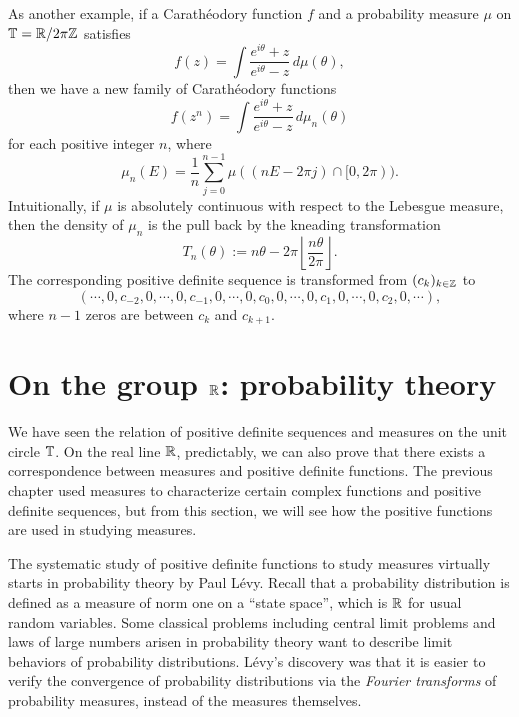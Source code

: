 \documentclass[10pt]{article}
\begin{document}
\begin{ex}
As another example, if a Carath\'eodory function $f$ and a probability measure $\mu$ on $\mathbb{T}=\mathbb{R}/2\pi\mathbb{Z}$ satisfies
\[f(z)=\int\frac{e^{i\theta}+z}{e^{i\theta}-z}\,d\mu(\theta),\]
then we have a new family of Carath\'eodory functions
\[f(z^n)=\int\frac{e^{i\theta}+z}{e^{i\theta}-z}\,d\mu_n(\theta)\]
for each positive integer $n$, where
\[\mu_n(E)=\frac1n\sum_{j=0}^{n-1}\mu((nE-2\pi j)\cap[0,2\pi)).\]
Intuitionally, if $\mu$ is absolutely continuous with respect to the Lebesgue measure, then the density of $\mu_n$ is the pull back by the kneading transformation
\[T_n(\theta):=n\theta-2\pi\left\lfloor\frac{n\theta}{2\pi}\right\rfloor.\]
The corresponding positive definite sequence is transformed from $(c_k)_{k\in\mathbb{Z}}$ to
\[(\cdots,0,c_{-2},0,\cdots,0,c_{-1},0,\cdots,0,c_0,0,\cdots,0,c_1,0,\cdots,0,c_2,0,\cdots),\]
where $n-1$ zeros are between $c_k$ and $c_{k+1}$.
\end{ex}

















\newpage
\section{On the group $\mathbb{R}$: probability theory}



We have seen the relation of positive definite sequences and measures on the unit circle $\mathbb{T}$.
On the real line $\mathbb{R}$, predictably, we can also prove that there exists a correspondence between measures and positive definite functions.
The previous chapter used measures to characterize certain complex functions and positive definite sequences, but from this section, we will see how the positive functions are used in studying measures.

The systematic study of positive definite functions to study measures virtually starts in probability theory by Paul L\'evy.
Recall that a probability distribution is defined as a measure of norm one on a ``state space'', which is $\mathbb{R}$ for usual random variables.
Some classical problems including central limit problems and laws of large numbers arisen in probability theory want to describe limit behaviors of probability distributions.
L\'evy's discovery was that it is easier to verify the convergence of probability distributions via the \emph{Fourier transforms} of probability measures, instead of the measures themselves.
\end{document}
